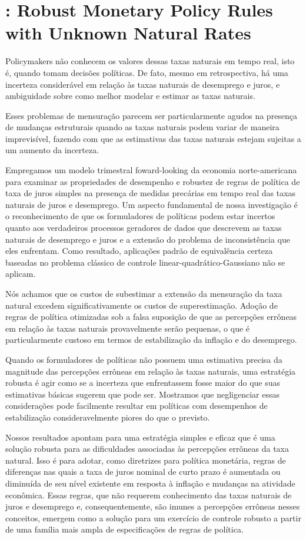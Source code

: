 %
%
\section{\citet{Orphanides:2002}: Robust Monetary Policy Rules with Unknown Natural Rates }
Policymakers não conhecem os valores dessas taxas naturais em tempo real, isto é, quando tomam decisões políticas. De fato, mesmo em retrospectiva, há uma incerteza considerável em relação às taxas naturais de desemprego e juros, e ambiguidade sobre como melhor modelar e estimar as taxas naturais.

Esses problemas de mensuração parecem ser particularmente agudos na presença de mudanças estruturais quando as taxas naturais podem variar de maneira imprevisível, fazendo com que as estimativas das taxas naturais estejam sujeitas a um aumento da incerteza.

Empregamos um modelo trimestral foward-looking da economia norte-americana para examinar as propriedades de desempenho e robustez de regras de política de taxa de juros simples na presença de medidas precárias em tempo real das taxas naturais de juros e desemprego. Um aspecto fundamental de nossa investigação é o reconhecimento de que os formuladores de políticas podem estar incertos quanto aos verdadeiros processos geradores de dados que descrevem as taxas naturais de desemprego e juros e a extensão do problema de inconsistência que eles enfrentam. Como resultado, aplicações padrão de equivalência certeza baseadas no problema clássico de controle linear-quadrático-Gaussiano não se aplicam.

Nós achamos que os custos de subestimar a extensão da mensuração da taxa natural excedem significativamente os custos de superestimação. Adoção de regras de política otimizadas sob a falsa suposição de que as percepções errôneas em relação às taxas naturais provavelmente serão pequenas, o que é particularmente custoso em termos de estabilização da inflação e do desemprego.

Quando os formuladores de políticas não possuem uma estimativa precisa da magnitude das percepções errôneas em relação às taxas naturais, uma estratégia robusta é agir como se a incerteza que enfrentassem fosse maior do que suas estimativas básicas sugerem que pode ser. Mostramos que negligenciar essas considerações pode facilmente resultar em políticas com desempenhos de estabilização consideravelmente piores do que o previsto.

Nossos resultados apontam para uma estratégia simples e eficaz que é uma solução robusta para as dificuldades associadas às percepções errôneas da taxa natural. Isso é para adotar, como diretrizes para política monetária, regras de diferenças nas quais a taxa de juros nominal de curto prazo é aumentada ou diminuída de seu nível existente em resposta à inflação e mudanças na atividade econômica. Essas regras, que não requerem conhecimento das taxas naturais de juros e desemprego e, consequentemente, são imunes a percepções errôneas nesses conceitos, emergem como a solução para um exercício de controle robusto a partir de uma família mais ampla de especificações de regras de política.

